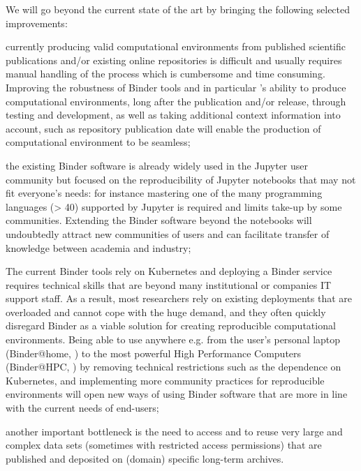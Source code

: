 We will go beyond the current state of the art by bringing the following selected improvements:
\begin{compactitem}
\item currently producing valid computational environments from published scientific publications and/or existing 
      online repositories is difficult and usually requires manual handling of the process which is cumbersome and 
      time consuming. Improving the robustness of Binder tools and in particular \repotodocker{}'s ability to 
      produce computational environments, long after the publication and/or release,
      through testing and development, as well as taking additional context information into account, 
      such as repository publication date will enable the production of computational environment to be seamless;
\item the existing Binder software is already widely used in the Jupyter user community but focused on the 
      reproducibility of Jupyter notebooks that may not fit everyone’s needs: for instance mastering one of the many
      programming languages (> 40) supported by Jupyter is required and limits take-up by some communities. Extending
      the Binder software beyond the notebooks will undoubtedly attract new communities of users and can facilitate 
      transfer of knowledge between academia and industry;
\item The current Binder tools rely on Kubernetes and deploying a Binder service requires technical skills that are 
      beyond many institutional or companies IT support staff. As a result, most researchers rely on existing 
      deployments that are overloaded and cannot cope with the huge demand, and they often quickly disregard Binder 
      as a viable solution for creating reproducible computational environments. Being able to use \repotodocker{} 
      anywhere e.g. from the user’s personal laptop (Binder@home, ) to the
      most powerful High Performance Computers (Binder@HPC, ) by removing technical restrictions such as the dependence on Kubernetes, and implementing more community practices for reproducible environments will open new ways of using Binder software that are more in line with the current needs of end-users;
\item another important bottleneck is the need to access and to reuse very large and complex data sets (sometimes
      with restricted access permissions) that are published and deposited on (domain) specific long-term archives.

\end{compactitem}
